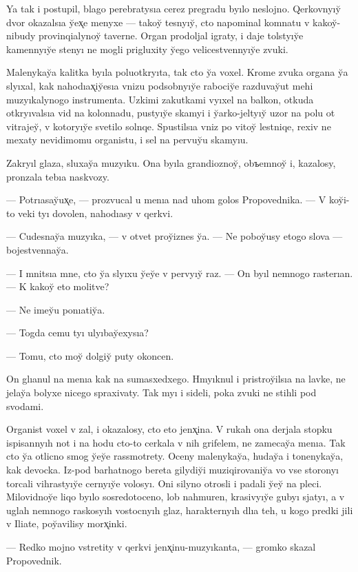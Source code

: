 \documentclass[10pt]{book}
\begin{document}
Ya tak i postupil, blago perebratysıa cerez pregradu byılo neslojno. Qerkovnyıy̆ dvor okazalsıa y̆ex̨e menyxe — takoy̆ tesnyıy̆, cto napominal komnatu v kakoy̆-nibudy provinqialynoy̆ taverne. Organ prodoljal igraty, i daje tolstyıy̆e kamennyıy̆e stenyı ne mogli prigluxity y̆ego velicestvennyıy̆e zvuki.

Malenykay̆a kalitka byıla poluotkryıta, tak cto y̆a voxel. Krome zvuka organa y̆a slyıxal, kak nahodıax̨iy̆esıa vnizu podsobnyıy̆e rabociy̆e razduvay̆ut mehi muzyıkalynogo instrumenta. Uzkimi zakutkami vyıxel na balkon, otkuda otkryıvalsıa vid na kolonnadu, pustyıy̆e skamyi i y̆arko-jeltyıy̆ uzor na polu ot vitrajey̆, v kotoryıy̆e svetilo solnqe. Spustilsıa vniz po vitoy̆ lestniqe, rexiv ne mexaty nevidimomu organistu, i sel na pervuy̆u skamyıu.

Zakryıl glaza, sluxay̆a muzyıku. Ona byıla grandioznoy̆, obъemnoy̆ i, kazalosy, pronzala tebıa naskvozy.

— Potrıasay̆ux̨e, — prozvucal u menıa nad uhom golos Propovednika. — V koy̆i-to veki tyı dovolen, nahodıasy v qerkvi.

— Cudesnay̆a muzyıka, — v otvet proy̆iznes y̆a. — Ne poboy̆usy etogo slova — bojestvennay̆a.

— I mnitsıa mne, cto y̆a slyıxu y̆ey̆e v pervyıy̆ raz. — On byıl nemnogo rasterıan. — K kakoy̆ eto molitve?

— Ne imey̆u ponıatiy̆a.

— Togda cemu tyı ulyıbay̆exysıa?

— Tomu, cto moy̆ dolgiy̆ puty okoncen.

On glıanul na menıa kak na sumasxedxego. Hmyıknul i pristroy̆ilsıa na lavke, ne jelay̆a bolyxe nicego spraxivaty. Tak myı i sideli, poka zvuki ne stihli pod svodami.

Organist voxel v zal, i okazalosy, cto eto jenx̨ina. V rukah ona derjala stopku ispisannyıh not i na hodu cto-to cerkala v nih grifelem, ne zamecay̆a menıa. Tak cto y̆a otlicno smog y̆ey̆e rassmotrety. Oceny malenykay̆a, huday̆a i tonenykay̆a, kak devocka. Iz-pod barhatnogo bereta gilydiy̆i muziqirovaniy̆a vo vse storonyı torcali vihrastyıy̆e cernyıy̆e volosyı. Oni silyno otrosli i padali y̆ey̆ na pleci. Milovidnoy̆e liqo byılo sosredotoceno, lob nahmuren, krasivyıy̆e gubyı sjatyı, a v uglah nemnogo raskosyıh vostocnyıh glaz, harakternyıh dlıa teh, u kogo predki jili v Iliate, poy̆avilisy morx̨inki.

— Redko mojno vstretity v qerkvi jenx̨inu-muzyıkanta, — gromko skazal Propovednik.
\end{document}
